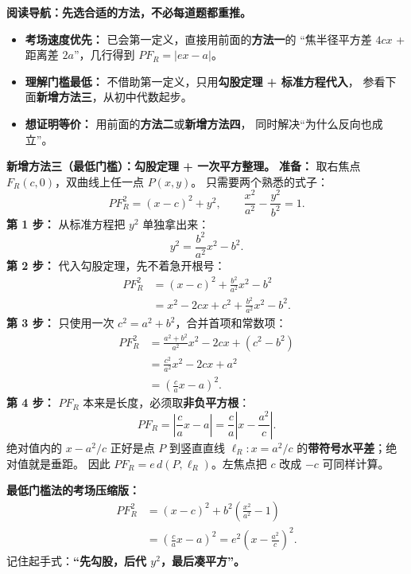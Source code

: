 \begin{proofbox}

\textbf{阅读导航：先选合适的方法，不必每道题都重推。}
\begin{itemize}
\item \textbf{考场速度优先：} 已会第一定义，直接用前面的\textbf{方法一}的
“焦半径平方差 $4cx$ + 距离差 $2a$”，几行得到 $PF_R=|ex-a|$。
\item \textbf{理解门槛最低：} 不借助第一定义，只用\textbf{勾股定理 + 标准方程代入}，
参看下面\textbf{新增方法三}，从初中代数起步。
\item \textbf{想证明等价：} 用前面的\textbf{方法二}或\textbf{新增方法四}，
同时解决“为什么反向也成立”。
\end{itemize}
\medskip

\medskip
\textbf{新增方法三（最低门槛）：勾股定理 + 一次平方整理。}
\textbf{准备：} 取右焦点 $F_R(c,0)$，双曲线上任一点 $P(x,y)$。
只需要两个熟悉的式子：
\[
PF_R^2=(x-c)^2+y^2,\qquad
\frac{x^2}{a^2}-\frac{y^2}{b^2}=1.
\]
\textbf{第 1 步：} 从标准方程把 $y^2$ 单独拿出来：
\[
y^2=\frac{b^2}{a^2}x^2-b^2.
\]
\textbf{第 2 步：} 代入勾股定理，先不着急开根号：
\[
\begin{aligned}
PF_R^2
&=(x-c)^2+\frac{b^2}{a^2}x^2-b^2\\
&=x^2-2cx+c^2+\frac{b^2}{a^2}x^2-b^2.
\end{aligned}
\]
\textbf{第 3 步：} 只使用一次 $c^2=a^2+b^2$，合并首项和常数项：
\[
\begin{aligned}
PF_R^2
&=\frac{a^2+b^2}{a^2}x^2-2cx+(c^2-b^2)\\
&=\frac{c^2}{a^2}x^2-2cx+a^2\\
&=\left(\frac ca x-a\right)^2.
\end{aligned}
\]
\textbf{第 4 步：} $PF_R$ 本来是长度，必须取\textbf{非负平方根}：
\[
PF_R=\left|\frac ca x-a\right|
=\frac ca\left|x-\frac{a^2}{c}\right|.
\]
绝对值内的 $x-a^2/c$ 正好是点 $P$ 到竖直直线
$\ell_R:x=a^2/c$ 的\textbf{带符号水平差}；绝对值就是垂距。
因此 $PF_R=e\,d(P,\ell_R)$。左焦点把 $c$ 改成 $-c$ 可同样计算。

\end{proofbox}
\clearpage
\begin{proofbox}
\textbf{最低门槛法的考场压缩版：}
\[
\boxed{\begin{aligned}
PF_R^2&=(x-c)^2+b^2\left(\frac{x^2}{a^2}-1\right)\\
&=\left(\frac ca x-a\right)^2
=e^2\left(x-\frac{a^2}{c}\right)^2.
\end{aligned}}
\]
记住起手式：\textbf{“先勾股，后代 $y^2$，最后凑平方”。}

\medskip
\end{proofbox}
